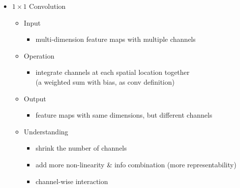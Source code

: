 \begin{itemize}
\item $1\times1$ Convolution
	\begin{itemize}
	\item Input
		\begin{itemize}
		\item multi-dimension feature maps with multiple channels
		\end{itemize}
	\item Operation
		\begin{itemize}
		\item integrate channels at each spatial location together \\
		(a weighted sum with bias, as conv definition)
		\end{itemize}
	\item Output
		\begin{itemize}
		\item feature maps with same dimensions, but different channels
		\end{itemize}
	\item Understanding
		\begin{itemize}
		\item shrink the number of channels
		\item add more non-linearity \& info combination (more representability)
		\item channel-wise interaction
		\end{itemize}
	\end{itemize}


\end{itemize}

